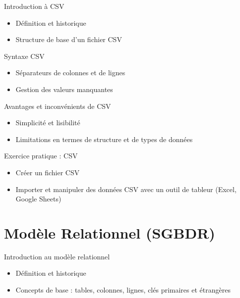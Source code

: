\documentclass{beamer}
\begin{document}
\begin{frame}{Introduction à CSV}
    \begin{itemize}
        \item Définition et historique
        \item Structure de base d'un fichier CSV
    \end{itemize}
\end{frame}

\begin{frame}{Syntaxe CSV}
    \begin{itemize}
        \item Séparateurs de colonnes et de lignes
        \item Gestion des valeurs manquantes
    \end{itemize}
\end{frame}

\begin{frame}{Avantages et inconvénients de CSV}
    \begin{itemize}
        \item Simplicité et lisibilité
        \item Limitations en termes de structure et de types de données
    \end{itemize}
\end{frame}

\begin{frame}{Exercice pratique : CSV}
    \begin{itemize}
        \item Créer un fichier CSV
        \item Importer et manipuler des données CSV avec un outil de tableur (Excel, Google Sheets)
    \end{itemize}
\end{frame}

\section{Modèle Relationnel (SGBDR)}

\begin{frame}{Introduction au modèle relationnel}
    \begin{itemize}
        \item Définition et historique
        \item Concepts de base : tables, colonnes, lignes, clés primaires et étrangères
    \end{itemize}
\end{frame}
\end{document}

